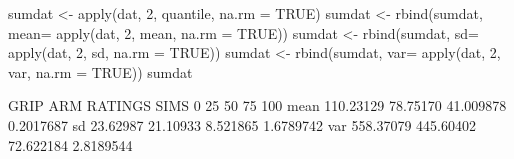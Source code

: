 \begin{Schunk}
\begin{Sinput}
 sumdat <- apply(dat, 2, quantile, na.rm = TRUE)
 sumdat <- rbind(sumdat, mean= apply(dat, 2, mean, na.rm = TRUE))
 sumdat <- rbind(sumdat, sd= apply(dat, 2, sd, na.rm = TRUE))
 sumdat <- rbind(sumdat, var= apply(dat, 2, var, na.rm = TRUE))
 sumdat
\end{Sinput}
\begin{Soutput}
          GRIP       ARM   RATINGS       SIMS
0%    29.00000  19.00000 21.600000 -4.1700000
25%   94.00000  64.50000 34.800000 -0.9650000
50%  111.00000  81.50000 41.300000  0.1600000
75%  124.50000  94.00000 47.700000  1.0700000
100% 189.00000 132.00000 57.200000  5.1700000
mean 110.23129  78.75170 41.009878  0.2017687
sd    23.62987  21.10933  8.521865  1.6789742
var  558.37079 445.60402 72.622184  2.8189544
\end{Soutput}
\end{Schunk}
